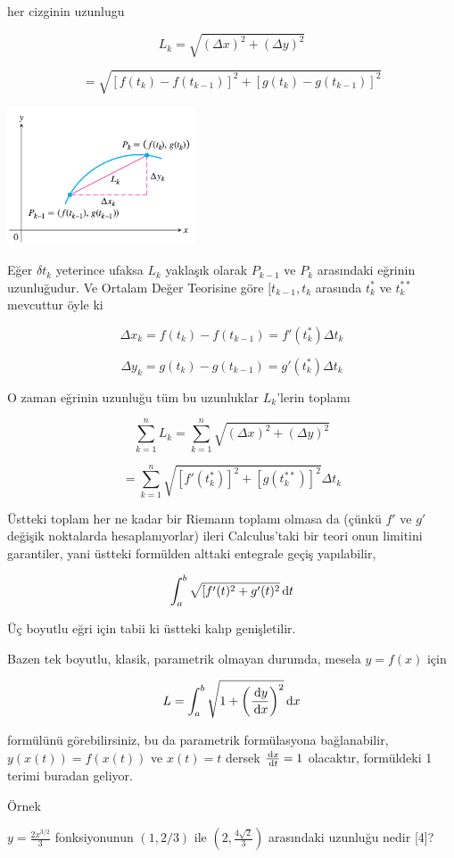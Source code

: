 \documentclass[12pt,fleqn]{article}\usepackage{../../common}
\begin{document}
her cizginin uzunlugu 

$$
L_k = \sqrt{(\Delta x)^2 + (\Delta y)^2}
$$

$$
= \sqrt{[f(t_k) - f(t_{k-1})]^2 + [g(t_k) - g(t_{k-1})]^2 }
$$

\includegraphics[width=15em]{calc_multi_06_03.png}

Eğer $\delta t_k$ yeterince ufaksa $L_k$ yaklaşık olarak $P_{k-1}$ ve $P_k$
arasındaki eğrinin uzunluğudur. Ve Ortalam Değer Teorisine göre
$[t_{k-1},t_k$ arasında $t_k^*$ ve $t_k^{**}$ mevcuttur öyle ki 

$$
\Delta x_k = f(t_k) - f(t_{k-1}) = f'(t_k^*) \Delta t_k
$$

$$
\Delta y_k = g(t_k) - g(t_{k-1}) = g'(t_k^*) \Delta t_k
$$

O zaman eğrinin uzunluğu tüm bu uzunluklar $L_k$'lerin toplamı 

$$
\sum _{k=1}^{n} L_k = \sum _{k=1}^{n} \sqrt{(\Delta x)^2 + (\Delta y)^2} 
$$

$$
= \sum _{k=1}^{n} \sqrt{[f'(t_k^*)]^2 + [g(t_k^{**})]^2} \Delta t_k
$$

Üstteki toplam her ne kadar bir Riemann toplamı olmasa da (çünkü $f'$ ve $g'$
değişik noktalarda hesaplanıyorlar) ileri Calculus'taki bir teori onun limitini
garantiler, yani üstteki formülden alttaki entegrale geçiş yapılabilir,

$$
\int _{a}^{b} \sqrt{[f'(t)^2 + g'(t)^2} \,\mathrm{d} t
$$

Üç boyutlu eğri için tabii ki üstteki kalıp genişletilir.

Bazen tek boyutlu, klasik, parametrik olmayan durumda, mesela $y = f(x)$ için

$$
L = \int _{a}^{b} \sqrt{1 + \left( \frac{\,\mathrm{d} y}{\,\mathrm{d} x} \right)^2} \,\mathrm{d} x 
$$

formülünü görebilirsiniz, bu da parametrik formülasyona bağlanabilir, $y(x(t))
= f(x(t))$ ve $x(t) = t$ dersek $\frac{\,\mathrm{d} x}{\,\mathrm{d} t} = 1$ olacaktır,
formüldeki 1 terimi buradan geliyor.

Örnek

$y = \frac{2 x ^{3/2}}{3}$ fonksiyonunun $(1,2/3)$ ile $(2,\frac{4\sqrt{2}}{3})$ 
arasındaki uzunluğu nedir [4]? 
\end{document}
